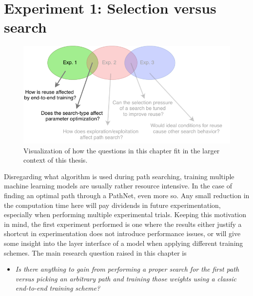 \chapter{Experiment 1: Selection versus search}
\label{exp1}

\begin{figure}[hb]
    \includegraphics[width=\textwidth]{Chapters/4.Experiments/exp1/figures/exp1.pdf}
    \caption[Experiment focus]{Visualization of how the questions in this chapter fit in the larger context of this thesis.}
    \label{fig:exp1.questions}
\end{figure}

Disregarding what algorithm is used during path searching, training multiple machine learning models are usually rather resource intensive. In the case of finding an optimal path through a PathNet, even more so. Any small reduction in the computation time here will pay dividends in future experimentation, especially when performing multiple experimental trials. Keeping this motivation in mind, the first experiment performed is one where the results either justify a shortcut in experimentation does not introduce performance issues, or will give some insight into the layer interface of a model when applying different training schemes.
\newline\newline
The main research question raised in this chapter is
\begin{itemize}
    \item \emph{Is there anything to gain from performing a proper search for the first path versus picking an arbitrary path and training those weights using a classic end-to-end training scheme?}
\end{itemize}


